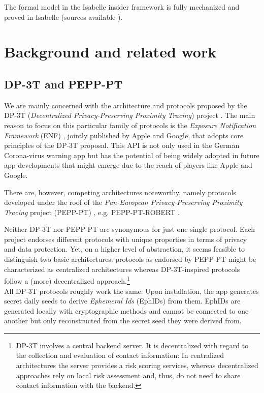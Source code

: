 \documentclass{llncs}
\begin{document}
The formal model in the Isabelle insider framework is fully mechanized and proved in
Isabelle (sources available \cite{kam:18smc}). 

\section{Background and related work}
\label{sec:background}
\subsection{DP-3T and PEPP-PT}
\label{sec:history}
We are mainly concerned with the architecture and protocols proposed by the
DP-3T (\textit{Decentralized Privacy-Preserving Proximity Tracing}) project \cite{dp3t:github}.
The main reason to focus on this particular family of protocols is the
\textit{Exposure Notification Framework} (ENF) \cite{enf:proj}, jointly published by Apple and Google, that adopts
core principles of the DP-3T proposal. This API is not only used in the German
Corona-virus warning app but has the potential of being widely adopted in future
app developments that might emerge due to the reach of players like Apple and Google.

There are, however, competing architectures noteworthy, namely protocols developed under the
roof of the \textit{Pan-European Privacy-Preserving Proximity Tracing} project (PEPP-PT) \cite{pepppt:github}, e.g.
PEPP-PT-ROBERT \cite{pepppt:ROBERT}.

Neither DP-3T nor PEPP-PT are synonymous for just one single protocol. Each project endorses
different protocols with unique properties in terms of privacy and data protection.
Yet, on a higher level of abstraction, it seems feasible to distinguish two basic architectures:
protocols as endorsed by PEPP-PT might be characterized as centralized architectures whereas
DP-3T-inspired protocols follow a (more) decentralized approach.\footnote{%
  DP-3T involves a central backend server. It is decentralized with regard to
  the collection and evaluation of contact information:
  In centralized architectures the server provides a risk scoring services, whereas decentralized
  approaches rely on local risk assessment and, thus, do not need to share contact information with
  the backend.}
\\

All DP-3T protocols roughly work the same:
%
Upon installation, the app generates secret daily seeds to derive \textit{Ephemeral Ids}
(EphIDs) from them. EphIDs are generated locally with cryptographic methods and cannot be connected
to one another but only reconstructed from the secret seed they were derived from.
\end{document}
